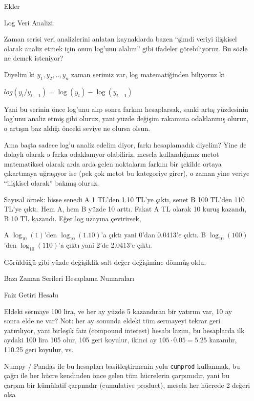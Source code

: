 \documentclass[12pt,fleqn]{article}\usepackage{../../common}
\begin{document}
Ekler

Log Veri Analizi 

Zaman serisi veri analizlerini anlatan kaynaklarda bazen ``şimdi veriyi
ilişkisel olarak analiz etmek için onun log'unu alalım'' gibi ifadeler
görebiliyoruz. Bu sözle ne demek isteniyor? 

Diyelim ki $y_1,y_2,..,y_n$ zaman serimiz var, log matematiğinden biliyoruz ki

$log(y_{t}/y_{t-1}) = \log(y_t) - \log(y_{t-1})$  

Yani bu serinin önce log'unu alıp sonra farkını hesaplarsak, sanki artış
yüzdesinin log'unu analiz etmiş gibi oluruz, yani yüzde değişim rakamına
odaklanmış oluruz, o artışın baz aldığı önceki seviye ne olursa olsun. 

Ama başta sadece log'u analiz edelim diyor, farkı hesaplamadık diyelim?
Yine de dolaylı olarak o farka odaklanıyor olabiliriz, mesela kullandığımız
metot matematiksel olarak arda arda gelen noktaların farkını bir şekilde
ortaya çıkartmaya uğraşıyor ise (pek çok metot bu kategoriye girer), o
zaman yine veriye ``ilişkisel olarak'' bakmış oluruz.

Sayısal örnek: hisse senedi A 1 TL'den 1.10 TL'ye çıktı, senet B 100 TL'den
110 TL'ye çıktı. Hem A, hem B yüzde 10 arttı. Fakat A TL olarak 10 kuruş
kazandı, B 10 TL kazandı. Eğer log uzayına çevirirsek, 

A $\log_{10}(1)$'den $\log_{10}(1.10)$'a çıktı yani 0'dan 0.0413'e çıktı. 
B $\log_{10}(100)$'den $\log_{10}(110)$'a çıktı yani 2'de 2.0413'e çıktı. 

Görüldüğü gibi yüzde değişiklik salt değer değişimine dönmüş oldu.

\newpage

Bazı Zaman Serileri Hesaplama Numaraları

Faiz Getiri Hesabı

Eldeki sermaye 100 lira, ve her ay yüzde 5 kazandıran bir yatırım var, 10
ay sonra elde ne var? Not: her ay sonunda eldeki tüm sermayeyi tekrar geri
yatırılıyor, yani birleşik faiz (compound interest) hesabı lazım, bu
hesaplarda ilk aydaki 100 lira 105 olur, 105 geri koyulur, ikinci ay 
$105 \cdot 0.05 = 5.25$ kazanılır, 110.25 geri koyulur, vs.

Numpy / Pandas ile bu hesapları basitleştirmenin yolu \verb!cumprod!
kullanmak, bu çağrı ile her hücre kendinden önce gelen tüm hücrelerin
çarpımıdır, yani bu çarpım bir kümülatif çarpımdır (cumulative product),
mesela her hücrede 2 değeri olsa
\end{document}
